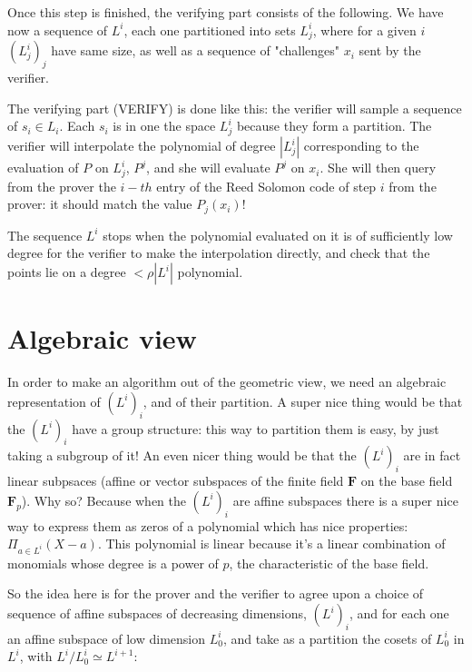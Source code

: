 \documentclass[12pt]{extarticle}
\newcommand{\<}{\langle}
\renewcommand{\>}{\rangle}
\theoremstyle{definition}
\begin{document}
Once this step is finished, the verifying part consists of the following. We have now a sequence of $L^i$, each one partitioned into sets $L^i_j$, where for a given $i$ $(L^i_j)_j$ have same size, as well as a sequence of "challenges" $x_i$ sent by the verifier.

The verifying part (VERIFY) is done like this: the verifier will sample a sequence of $s_i\in L_i$. Each $s_i$ is in one the space $L^i_j$ because they form a partition. The verifier will interpolate the polynomial of degree $|L^i_j|$ corresponding to the evaluation of $P$ on $L^i_j$, $P^j$, and she will evaluate $P^j$ on $x_i$. She will then query from the prover the $i-th$ entry of the Reed Solomon code of step $i$ from the prover: it should match the value $P_j(x_i)$!

The sequence $L^i$ stops when the polynomial evaluated on it is of sufficiently low degree for the verifier to make the interpolation directly, and check that the points lie on a degree $<\rho |L^i|$ polynomial.

\section{Algebraic view}

In order to make an algorithm out of the geometric view, we need an algebraic representation of $(L^i)_i$, and of their partition. A super nice thing would be that the $(L^i)_i$ have a group structure: this way to partition them is easy, by just taking a subgroup of it! An even nicer thing would be that the $(L^i)_i$ are in fact linear subpsaces (affine or vector subspaces of the finite field $\mathbf{F}$ on the base field $\mathbf{F}_p$). Why so? Because when the $(L^i)_i$ are affine subspaces there is a super nice way to express them as zeros of a polynomial which has nice properties: $\Pi_{a\in L^i}(X-a)$. This polynomial is linear because it's a linear combination of monomials whose degree is a power of $p$, the characteristic of the base field.

So the idea here is for the prover and the verifier to agree upon a choice of sequence of affine subspaces of decreasing dimensions, $(L^i)_i$, and for each one an affine subspace of low dimension $L^i_0$, and take as a partition the cosets of $L^i_0$ in $L^i$, with $L^i/L^i_0\simeq L^{i+1}$:
\end{document}
